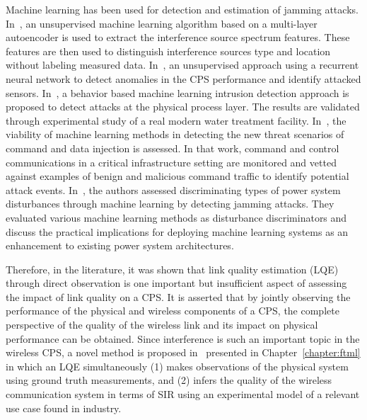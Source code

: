 Machine learning has been used for detection and estimation of jamming attacks. In~\cite{Chen2019}, an unsupervised machine learning algorithm based on a multi-layer autoencoder is used to extract the interference source spectrum features. These features are then used to distinguish interference sources type and location without labeling measured data. In~\cite{7911887},  an unsupervised approach using a recurrent neural network to detect anomalies in the CPS performance and identify attacked sensors. In~\cite{Junejo2016DataDP}, a behavior based machine learning intrusion detection approach  is proposed to detect attacks at the physical process layer. The results are validated through experimental study of a real modern water treatment facility. In~\cite{Beaver:2013:EML:2584691.2584722}, the viability of machine learning methods in detecting the new threat scenarios of command and data injection is assessed. In that work, command and control communications in a critical infrastructure setting are monitored and vetted against examples of benign and malicious command traffic to identify potential attack events. In~\cite{6900095}, the authors assessed discriminating types of power system disturbances through machine learning by detecting jamming attacks. They evaluated various machine learning methods as disturbance discriminators and discuss the practical implications for deploying machine learning systems as an enhancement to existing power system architectures.

Therefore, in the literature, it was shown that link quality estimation (LQE) through direct observation is one important but insufficient aspect of assessing the impact of link quality on a CPS. It is asserted that by jointly observing the performance of the physical and wireless components of a CPS, the complete perspective of the quality of the wireless link and its impact on physical performance can be obtained. Since interference is such an important topic in the wireless CPS, a novel method is proposed in~\cite{Candell_ISIT_2019,CandellIJAMT2020.Jrml} presented in Chapter~\ref{chapter:ftml} in which an LQE simultaneously (1) makes observations of the physical system using ground truth measurements, and (2) infers the quality of the wireless communication system in terms of SIR using an experimental model of a relevant use case found in industry.


